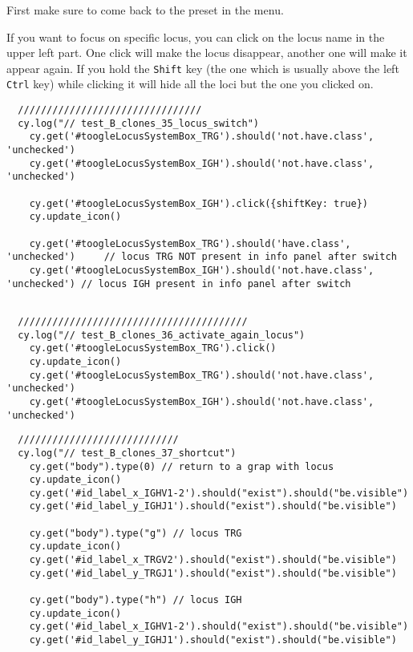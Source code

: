 First make sure to come back to the preset  in the  menu.

If you want to focus on specific locus, you can click on the locus name in
the upper left part. One click will make the locus disappear, another one will
make it appear again.
If you hold the \texttt{Shift} key (the one which is usually above the left
\texttt{Ctrl} key) while clicking it will hide all the loci but the one you
clicked on.

\begin{verbatim}
  ////////////////////////////////
  cy.log("// test_B_clones_35_locus_switch")
    cy.get('#toogleLocusSystemBox_TRG').should('not.have.class', 'unchecked')
    cy.get('#toogleLocusSystemBox_IGH').should('not.have.class', 'unchecked')

    cy.get('#toogleLocusSystemBox_IGH').click({shiftKey: true})
    cy.update_icon()

    cy.get('#toogleLocusSystemBox_TRG').should('have.class', 'unchecked')     // locus TRG NOT present in info panel after switch
    cy.get('#toogleLocusSystemBox_IGH').should('not.have.class', 'unchecked') // locus IGH present in info panel after switch


\end{verbatim}

\begin{verbatim}
  ////////////////////////////////////////
  cy.log("// test_B_clones_36_activate_again_locus")
    cy.get('#toogleLocusSystemBox_TRG').click()
    cy.update_icon()
    cy.get('#toogleLocusSystemBox_TRG').should('not.have.class', 'unchecked')
    cy.get('#toogleLocusSystemBox_IGH').should('not.have.class', 'unchecked')

\end{verbatim}

\begin{verbatim}
  ////////////////////////////
  cy.log("// test_B_clones_37_shortcut")
    cy.get("body").type(0) // return to a grap with locus 
    cy.update_icon()
    cy.get('#id_label_x_IGHV1-2').should("exist").should("be.visible")
    cy.get('#id_label_y_IGHJ1').should("exist").should("be.visible")

    cy.get("body").type("g") // locus TRG
    cy.update_icon()
    cy.get('#id_label_x_TRGV2').should("exist").should("be.visible")
    cy.get('#id_label_y_TRGJ1').should("exist").should("be.visible")

    cy.get("body").type("h") // locus IGH
    cy.update_icon()
    cy.get('#id_label_x_IGHV1-2').should("exist").should("be.visible")
    cy.get('#id_label_y_IGHJ1').should("exist").should("be.visible")


\end{verbatim}

